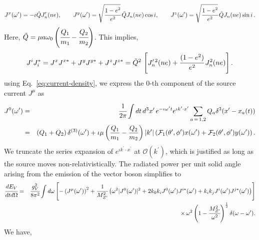 \documentclass[aps,prd]{revtex4-2}
\begin{document}
\begin{eqnarray}\label{eq:current-density-x-y-z}
    J^{x}(\omega^{\prime}) = -\iota \tilde{Q} J^{\prime}_{n} (ne), \qquad
    J^{y}(\omega^{\prime}) = \sqrt{\cfrac{1-e^2}{e^2}}\,\tilde{Q}J_{n}(ne)\cos {i}, \qquad 
     J^{z}(\omega^{\prime}) =  \sqrt{\cfrac{1-e^2}{e^2}}\,\tilde{Q}J_n (ne) \sin i\,.
\end{eqnarray}
Here, $\tilde{Q} = \mu a\omega_{0}\left(\cfrac{Q_{1}}{m_{1}} - \cfrac{Q_{2}}{m_{2}}\right)$. This implies,
\begin{eqnarray}\label{eq:current-density-sq-spatial}
    J^{i}J^*_{i} = J^{x}J^{x*} + J^{y}J^{y*} + J^{z}J^{z*}
    = \tilde{Q}^2 \,\left[ J^{\prime\,2}_n (ne) + \cfrac{(1-e^2)}{e^2}\,J^2_n (ne) \right].
\end{eqnarray}
using Eq.~\eqref{eq:current-density}, we express the $0$-th component of the source current $J^{\mu}$ as  
\begin{eqnarray}\label{eq:current-density-sq-temporal-1_gauge}
    J^{0}(\omega^{\prime}) &=& \cfrac{1}{2\pi}\int dt\, d^{3}x^{\prime}\, e^{-\iota \omega^{\prime} t}  e^{\iota k^{\prime}\cdot x^{\prime}}\sum_{a\,=\,1,2}Q_{a}\delta^{3}(x^{\prime}-x_{a}(t)) \nonumber \\
    &=& \left(Q_{1}+Q_{2}\right)\delta^{(3)}(\omega^{\prime})+\iota \mu \left(\frac{Q_{1}}{m_{1}} - \frac{Q_{2}}{m_{2}}\right)|k^{\prime}|\left(\mathcal{F}_{1}(\theta^{\prime}, \phi^{\prime}) x(\omega^{\prime}) + \mathcal{F}_{2}(\theta^{\prime}, \phi^{\prime}) y(\omega^{\prime})\right).
\end{eqnarray}
We truncate the series expansion of $e^{\iota k^{\prime}\cdot x^{\prime}}$ at $\mathcal{O}(k^{\prime})$, which is justified as long as the source moves non-relativistically. The radiated power per unit solid angle arising from the emission of the vector boson simplifies to 
\begin{eqnarray}\label{eq:rate-of-energy-loss-vector-2}
    \cfrac{dE_{V}}{dt d\Omega} &=& \cfrac{g_{V}^{2}}{8\pi^2} \int d\omega \left[ -\left(J^{\mu}(\omega^{\prime})\right)^{2} + \cfrac{1}{M_{Z^{\prime}}^{2}}\left(\omega^{2} |J^0(\omega^\prime)|^{2} + 2 k_{0} k_{i} J^{0}(\omega^{\prime}) J^{i*}(\omega^{\prime}) +  k_{i} k_{j} J^{i}(\omega^{\prime}) J^{j*}(\omega^{\prime})\right) \right]  \nonumber\\
    &&\qquad \qquad  \times\, \omega^{2}\left(1 - \cfrac{M^2_{Z^\prime}}{\omega^2}\right)^{\frac{1}{2}} \delta(\omega - \omega^\prime).
\end{eqnarray}
We have,
\end{document}
